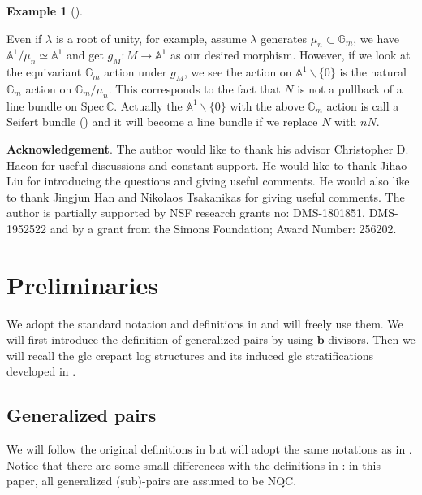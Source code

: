 \documentclass[11pt]{amsart}
\numberwithin{equation}{section}
\newcommand{\bb}{\bm{b}}
\newcommand{\Spec}{\mathrm{Spec}}
\newcommand{\Cc}{\mathbb{C}}
\theoremstyle{definition}
\theoremstyle{definition}
\newtheorem{ex}[thm]{Example}
\theoremstyle{definition}
\begin{document}
\begin{ex}[{\cite[Example 4.15]{LX22b}}]
\begin{enumerate}
Even if $\lambda$ is a root of unity, for example, assume $\lambda$ generates $\mu_{n}\subset\mathbb{G}_m$, we have $\mathbb{A}^1/\mu_n\simeq\mathbb{A}^1$ and get $g_M: M\to \mathbb{A}^1$ as our desired morphism. However, if we look at the equivariant $\mathbb{G}_m$ action under $g_M$, we see the action on $\mathbb{A}^1\backslash\{0\}$ is the natural $\mathbb{G}_m$ action on $\mathbb{G}_m/\mu_n$. This corresponds to the fact that $N$ is not a pullback of a line bundle on $\Spec~\Cc$. Actually the $\mathbb{A}^1\backslash\{0\}$ with the above $\mathbb{G}_m$ action is call a Seifert bundle (\cite[Definition 9.50]{Kol13}) and it will become a line bundle if we replace $N$ with $nN$.

\end{enumerate}


\end{ex}


\noindent\textbf{Acknowledgement}. The author would like to thank his advisor Christopher D. Hacon for useful discussions and constant support. He would like to thank Jihao Liu for introducing the questions and giving useful comments. He would also like to thank Jingjun Han and Nikolaos Tsakanikas for giving useful comments. The author is partially supported by NSF research grants no: DMS-1801851, DMS-1952522 and by a grant from the Simons Foundation; Award Number: 256202.


\section{Preliminaries}\label{sec: preliminaries}

We adopt the standard notation and definitions in \cite{KM98,BCHM10} and will freely use them. We will first introduce the definition of generalized pairs by using $\bb$-divisors. Then we will recall the glc crepant log structures and its induced glc stratifications developed in \cite{LX22b}. 

\subsection{Generalized pairs}

We will follow the original definitions in \cite{BZ16} but will adopt the same notations as in \cite{HL21a}. Notice that there are some small differences with the definitions in \cite{HL21a}: in this paper, all generalized (sub)-pairs are assumed to be NQC.
\end{document}
